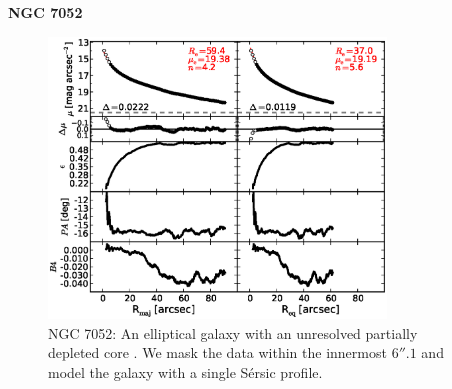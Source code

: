 \documentclass[preprint2]{emulateapj}
\newcommand{\fitfigurewidth}{0.8\textwidth}
\begin{document}
  \clearpage\newpage\noindent
  {\bf NGC 7052 \\}

  \begin{figure}[h]
  \begin{center}
  \includegraphics[width=\fitfigurewidth]{n7052_1Dfit.eps}
  \caption{NGC 7052: 
  An elliptical galaxy with an unresolved partially depleted core \citep{quillen2000}. %
  We mask the data within the innermost $6''.1$ and model the galaxy with a single S\'ersic profile.
  }
  \end{center}
  \end{figure}
\end{document}
